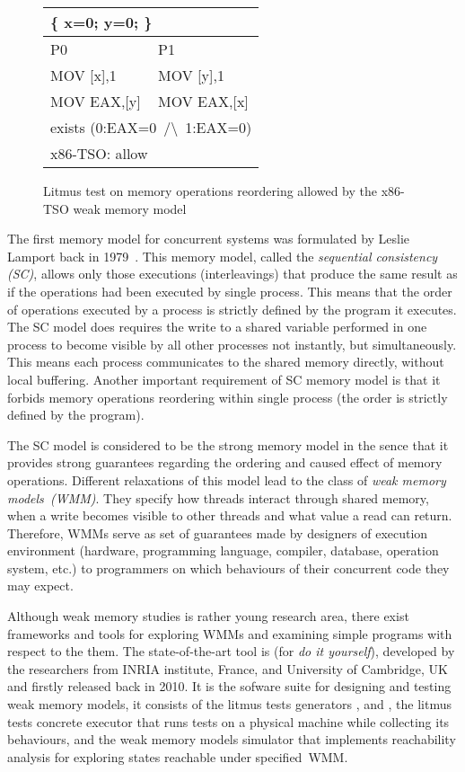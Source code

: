 \begin{figure}
\small \ttfamily
\begin{tabular}{ |l|l| }
\hline
\multicolumn{2}{|l|}{ \{ x=0; y=0; \}} \tabularnewline \hline
P0 & P1 \\ \hline
MOV [x],1 & MOV [y],1 \\
MOV EAX,[y] & MOV EAX,[x] \\
\hline
\multicolumn{2}{|l|}{exists (0:EAX=0~/\textbackslash~1:EAX=0)} \tabularnewline
\hline
\multicolumn{2}{|l|}{x86-TSO: allow} \tabularnewline
\hline

\end{tabular}
\caption{Litmus test on memory operations reordering allowed by the x86-TSO weak memory model}
\label{simple_wmm_x86}
\end{figure}

The first memory model for concurrent systems was formulated by Leslie Lamport back in 1979~\cite{lamport1979make}. This memory model, called the \textit{sequential consistency (SC)}, allows only those executions (interleavings) that produce the same result as if the operations had been executed by single process. This means that the order of operations executed by a process is strictly defined by the program it executes. The SC model does requires the write to a shared variable performed in one process to become visible by all other processes not instantly, but simultaneously. This means each process communicates to the shared memory directly, without local buffering. Another important requirement of SC memory model is that it forbids memory operations reordering within single process (the order is strictly defined by the program).

The SC model is considered to be the strong memory model in the sence that it provides strong guarantees regarding the ordering and caused effect of memory operations. Different relaxations of this model lead to the class of \textit{weak memory models~(WMM)}.
They specify how threads interact through shared memory, when a write becomes visible to other threads and what value a read can return. 
Therefore, WMMs serve as set of guarantees made by designers of execution environment (hardware, programming language, compiler, database, operation system, etc.) to programmers on which behaviours of their concurrent code they may expect. 

Although weak memory studies is rather young research area, there exist frameworks and tools for exploring WMMs and examining simple programs with respect to the them. The state-of-the-art tool is  (for \textit{do it yourself}), developed by the researchers from INRIA institute, France, and University of Cambridge, UK and firstly released back in 2010. It is the sofware suite for designing and testing weak memory models, it consists of the litmus tests generators ,  and , the litmus tests concrete executor  that runs tests on a physical machine while collecting its behaviours, and the weak memory models simulator  that implements reachability analysis for exploring states reachable under specified~WMM.

